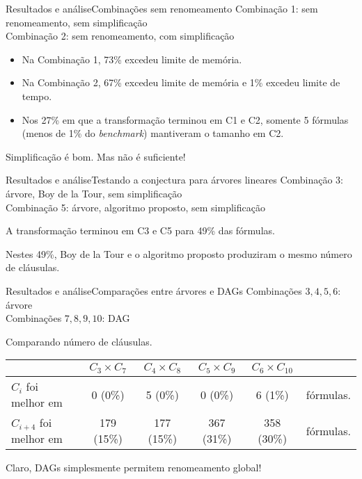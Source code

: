 \begin{frame}{Resultados e análise}{Combinações sem renomeamento}
	Combinação 1: sem renomeamento, sem simplificação\\
	Combinação 2: sem renomeamento, com simplificação
	
	\begin{itemize}
		\pause\item Na Combinação 1, 73\% excedeu limite de memória.
		\pause\item Na Combinação 2, 67\% excedeu limite de memória e 1\% excedeu limite de tempo.
		\pause\item Nos 27\% em que a transformação terminou em C1 e C2, somente 5 fórmulas (menos de 1\% do \textit{benchmark}) mantiveram o tamanho em C2.
	\end{itemize}
	
	\pause Simplificação é bom. \pause Mas não é suficiente!
\end{frame}

\begin{frame}{Resultados e análise}{Testando a conjectura para árvores lineares}
	Combinação 3: árvore, Boy de la Tour, sem simplificação\\
	Combinação 5: árvore, algoritmo proposto, sem simplificação
	
	\pause A transformação terminou em C3 e C5 para 49\% das fórmulas.
	
	\pause Nestes 49\%, Boy de la Tour e o algoritmo proposto produziram o mesmo número de cláusulas.
\end{frame}

\begin{frame}{Resultados e análise}{Comparações entre árvores e DAGs}
	Combinações $3,4,5,6$: árvore\\
	Combinações $7,8,9,10$: DAG
	
	\vspace{.1cm}
	\pause \begin{center}Comparando número de cláusulas.\end{center}
	\begin{scriptsize}
	\begin{tabular}{l|c|c|c|c|l}
		& $C_3 \times C_7$ & $C_4 \times C_8$ & $C_5 \times C_9$ & $C_6 \times C_{10}$ \\ \hline
		$C_i$ foi melhor em & 0 (0\%)     & 5 (0\%)     & 0 (0\%)     & 6 (1\%)      & fórmulas. \\
		$C_{i+4}$ foi melhor em   & 179 (15\%)  & 177 (15\%)  & 367 (31\%)  & 358 (30\%)   & fórmulas. \\
	\end{tabular}
	\end{scriptsize}
	
	\vspace{.1cm}
	\pause Claro, DAGs simplesmente permitem renomeamento global!
\end{frame}

